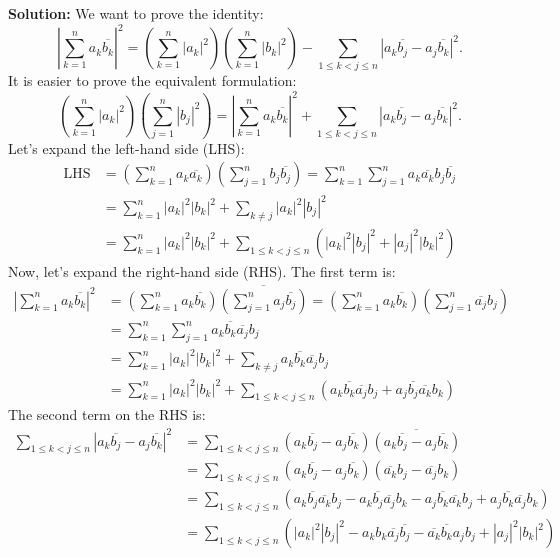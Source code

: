 \textbf{Solution:}
We want to prove the identity:
\[
\left| \sum_{k=1}^n a_k \overline{b_k} \right|^2 = \left( \sum_{k=1}^n |a_k|^2 \right) \left( \sum_{k=1}^n |b_k|^2 \right) - \sum_{1 \leq k < j \leq n} |a_k \overline{b_j} - a_j \overline{b_k}|^2.
\]
It is easier to prove the equivalent formulation:
\[
\left( \sum_{k=1}^n |a_k|^2 \right) \left( \sum_{j=1}^n |b_j|^2 \right) = \left| \sum_{k=1}^n a_k \overline{b_k} \right|^2 + \sum_{1 \leq k < j \leq n} |a_k \overline{b_j} - a_j \overline{b_k}|^2.
\]
Let's expand the left-hand side (LHS):
\begin{align*}
\text{LHS} &= \left( \sum_{k=1}^n a_k \overline{a_k} \right) \left( \sum_{j=1}^n b_j \overline{b_j} \right) = \sum_{k=1}^n \sum_{j=1}^n a_k \overline{a_k} b_j \overline{b_j} \\
&= \sum_{k=1}^n |a_k|^2 |b_k|^2 + \sum_{k \neq j} |a_k|^2 |b_j|^2 \\
&= \sum_{k=1}^n |a_k|^2 |b_k|^2 + \sum_{1 \leq k < j \leq n} (|a_k|^2 |b_j|^2 + |a_j|^2 |b_k|^2)
\end{align*}
Now, let's expand the right-hand side (RHS). The first term is:
\begin{align*}
\left| \sum_{k=1}^n a_k \overline{b_k} \right|^2 &= \left(\sum_{k=1}^n a_k \overline{b_k}\right) \overline{\left(\sum_{j=1}^n a_j \overline{b_j}\right)} = \left(\sum_{k=1}^n a_k \overline{b_k}\right) \left(\sum_{j=1}^n \overline{a_j} b_j\right) \\
&= \sum_{k=1}^n \sum_{j=1}^n a_k \overline{b_k} \overline{a_j} b_j \\
&= \sum_{k=1}^n |a_k|^2 |b_k|^2 + \sum_{k \neq j} a_k \overline{b_k} \overline{a_j} b_j \\
&= \sum_{k=1}^n |a_k|^2 |b_k|^2 + \sum_{1 \leq k < j \leq n} (a_k \overline{b_k} \overline{a_j} b_j + a_j \overline{b_j} \overline{a_k} b_k)
\end{align*}
The second term on the RHS is:
\begin{align*}
\sum_{1 \leq k < j \leq n} |a_k \overline{b_j} - a_j \overline{b_k}|^2 &= \sum_{1 \leq k < j \leq n} (a_k \overline{b_j} - a_j \overline{b_k}) \overline{(a_k \overline{b_j} - a_j \overline{b_k})} \\
&= \sum_{1 \leq k < j \leq n} (a_k \overline{b_j} - a_j \overline{b_k}) (\overline{a_k} b_j - \overline{a_j} b_k) \\
&= \sum_{1 \leq k < j \leq n} (a_k \overline{b_j} \overline{a_k} b_j - a_k \overline{b_j} \overline{a_j} b_k - a_j \overline{b_k} \overline{a_k} b_j + a_j \overline{b_k} \overline{a_j} b_k) \\
&= \sum_{1 \leq k < j \leq n} (|a_k|^2 |b_j|^2 - a_k b_k \overline{a_j} \overline{b_j} - \overline{a_k} \overline{b_k} a_j b_j + |a_j|^2 |b_k|^2)
\end{align*}

